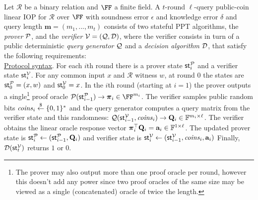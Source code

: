 \begin{definition} 
\label{def:linearIOP}
Let $\mathcal{R}$ be a binary relation and $\FF$ a finite field. A $t$-round $\ell$-query public-coin linear IOP for $\mathcal{R}$ over $\FF$ with soundness error $\epsilon$ and knowledge error $\delta$ and query length $\mathbf{m} = (m_1,...,m_t)$ consists of two stateful PPT algorithms, the \emph{prover} $\mathcal{P}$, and the
\emph{verifier} $\mathcal{V} = (\mathcal{Q}, \mathcal{D})$, where the verifier consists in turn of a public deterministic \emph{query generator} $\mathcal{Q}$ and a
\emph{decision algorithm} $\mathcal{D}$, that satisfy the following requirements:\\
 
\noindent \underline{Protocol syntax}. 
For each $i$th round there is a prover state $\textsf{st}^\mathcal{P}_i$ and a verifier state $\textsf{st}^\mathcal{V}_i$. For any common input $x$ and $\mathcal{R}$ witness $w$, at round 0 the states are $\textsf{st}^\mathcal{P}_0 = (x, w)$ and $\textsf{st}^\mathcal{V}_0 = x$. 
In the $i$th round (starting at $i = 1$) the prover outputs a single\footnote{The prover may also output more than one proof oracle per round, however this doesn't add any power since two proof oracles of the same size may be viewed as a single (concatenated) oracle of twice the length.} proof oracle $\prover(\textsf{st}^\prover_{i-1}) \rightarrow \proofO_i \in \FF^{m_i}$. The verifier samples public random bits $\mathit{coins}_i \overset{\$}{\gets} \{0,1\}^*$ and the query generator computes a query matrix from the verifier state and this randomness: $\mathcal{Q}(\textsf{st}^\mathcal{V}_{i-1}, \mathit{coins}_i) \rightarrow \mathbf{Q}_i \in \mathbb{F}^{m_i \times \ell}$. The verifier obtains the linear oracle response vector $\boldsymbol{\pi}_i^\top \mathbf{Q}_i = \mathbf{a}_i \in \mathbb{F}^{1 \times \ell}$. The updated prover state is $\textsf{st}^\mathcal{P}_i \leftarrow (\textsf{st}^\mathcal{P}_{i-1}, \mathbf{Q}_i)$
and verifier state is $\textsf{st}^\mathcal{V}_i \leftarrow (\textsf{st}^\mathcal{V}_{i-1}, \mathit{coins}_i, \mathbf{a}_i)$
Finally, $\mathcal{D}(\textsf{st}^\mathcal{V}_t)$ returns $1$ or $0$. \\ 




\end{definition}
